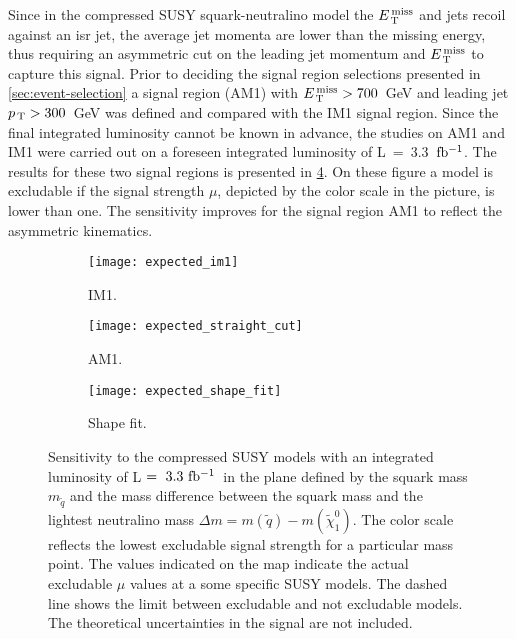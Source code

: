 Since in the compressed SUSY squark-neutralino model the $E_\mathrm{\, T}^\mathrm{\, miss}$ and jets recoil
against an \gls{isr} jet, the average jet momenta are lower than the missing
energy, thus requiring an asymmetric cut on the leading jet momentum and $E_\mathrm{\, T}^\mathrm{\, miss}$
to capture this signal. Prior to deciding the signal region selections presented
in \cref{sec:event-selection} a signal region (AM1) with $E_\mathrm{\, T}^\mathrm{\, miss} > 700$~GeV and
leading jet $p_\mathrm{\, T} > 300$~GeV was defined and compared with the IM1 signal
region. Since the final integrated luminosity cannot be known in advance, the
studies on AM1 and IM1 were carried out on a foreseen integrated luminosity of
L~=~3.3~$\mbox{fb$^{-1}$}$. The results for these two signal regions is presented in
\cref{fig:im1_straight_comparison}. On these figure a model is excludable if the
signal strength $\mu$, depicted by the color scale in the picture, is lower than
one. The sensitivity improves for the signal region AM1 to reflect the
asymmetric kinematics.
\begin{figure}[!h]
  \centering
  \begin{subfigure}[t]{.48\linewidth}
    \texttt{[image: expected\_im1]}
    \caption{IM1.}
    \label{fig:expected_im1}
  \end{subfigure}
  \begin{subfigure}[t]{.48\linewidth}
    \texttt{[image: expected\_straight\_cut]}
    \caption{AM1.}
    \label{fig:expected_straight}
  \end{subfigure}

  \begin{subfigure}[t]{.48\linewidth}
    \texttt{[image: expected\_shape\_fit]}
    \caption{Shape fit.}
    \label{fig:expected_shape}
  \end{subfigure}
  \caption{Sensitivity to the compressed SUSY models with an integrated
    luminosity of L$~=~3.3~\mbox{fb$^{-1}$}$~in the plane defined by the squark mass
    $m_{\tilde{q}}$ and the mass difference between the squark mass and the
    lightest neutralino mass
    $\Delta m = m(\tilde{q}) - m(\tilde{\chi}_{1}^{0})$. The color scale
    reflects the lowest excludable signal strength for a particular mass
    point. The values indicated on the map indicate the actual excludable $\mu$
    values at a some specific SUSY models. The dashed line shows the limit
    between excludable and not excludable models. The theoretical uncertainties
    in the signal are not included.}
  \label{fig:im1_straight_comparison}
\end{figure}


